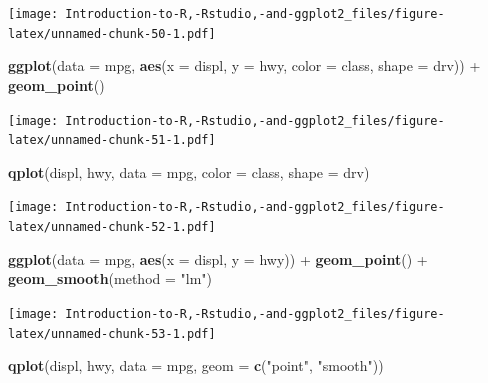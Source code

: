 \documentclass[]{book}
\newenvironment{Shaded}{\begin{snugshade}}{\end{snugshade}}
\newcommand{\KeywordTok}[1]{\textcolor[rgb]{0.13,0.29,0.53}{\textbf{{#1}}}}
\newcommand{\DataTypeTok}[1]{\textcolor[rgb]{0.13,0.29,0.53}{{#1}}}
\newcommand{\StringTok}[1]{\textcolor[rgb]{0.31,0.60,0.02}{{#1}}}
\newcommand{\NormalTok}[1]{{#1}}
\begin{document}
\texttt{[image: Introduction-to-R,-Rstudio,-and-ggplot2\_files/figure-latex/unnamed-chunk-50-1.pdf]}

\begin{Shaded}
\begin{Highlighting}[]
\KeywordTok{ggplot}\NormalTok{(}\DataTypeTok{data =} \NormalTok{mpg, }\KeywordTok{aes}\NormalTok{(}\DataTypeTok{x =} \NormalTok{displ, }\DataTypeTok{y =} \NormalTok{hwy, }\DataTypeTok{color =} \NormalTok{class, }\DataTypeTok{shape =} \NormalTok{drv)) +}\StringTok{ }\KeywordTok{geom_point}\NormalTok{()}
\end{Highlighting}
\end{Shaded}

\texttt{[image: Introduction-to-R,-Rstudio,-and-ggplot2\_files/figure-latex/unnamed-chunk-51-1.pdf]}

\begin{Shaded}
\begin{Highlighting}[]
\KeywordTok{qplot}\NormalTok{(displ, hwy, }\DataTypeTok{data =} \NormalTok{mpg, }\DataTypeTok{color =} \NormalTok{class, }\DataTypeTok{shape =} \NormalTok{drv)}
\end{Highlighting}
\end{Shaded}

\texttt{[image: Introduction-to-R,-Rstudio,-and-ggplot2\_files/figure-latex/unnamed-chunk-52-1.pdf]}

\begin{Shaded}
\begin{Highlighting}[]
\KeywordTok{ggplot}\NormalTok{(}\DataTypeTok{data =} \NormalTok{mpg, }\KeywordTok{aes}\NormalTok{(}\DataTypeTok{x =} \NormalTok{displ, }\DataTypeTok{y =} \NormalTok{hwy)) +}\StringTok{ }\KeywordTok{geom_point}\NormalTok{() +}\StringTok{ }\KeywordTok{geom_smooth}\NormalTok{(}\DataTypeTok{method =} \StringTok{"lm"}\NormalTok{)}
\end{Highlighting}
\end{Shaded}

\texttt{[image: Introduction-to-R,-Rstudio,-and-ggplot2\_files/figure-latex/unnamed-chunk-53-1.pdf]}

\begin{Shaded}
\begin{Highlighting}[]
\KeywordTok{qplot}\NormalTok{(displ, hwy, }\DataTypeTok{data =} \NormalTok{mpg, }\DataTypeTok{geom =} \KeywordTok{c}\NormalTok{(}\StringTok{"point"}\NormalTok{, }\StringTok{"smooth"}\NormalTok{)) }
\end{Highlighting}
\end{Shaded}
\end{document}
